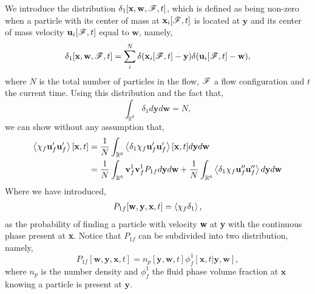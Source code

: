 We introduce the distribution $\delta_1[\textbf{x},\textbf{w},\mathscr{F},t]$, which is defined as being non-zero when a particle with its center of mass at $\textbf{x}_i[\mathscr{F},t]$ is located at $\textbf{y}$ and its center of mass velocity $\textbf{u}_i[\mathscr{F},t]$ equal to $\textbf{w}$, namely, 
\begin{equation*}
    \delta_1[\textbf{x},\textbf{w},\mathscr{F},t] =\sum_i^N \delta(\textbf{x}_i[\mathscr{F},t] - \textbf{y})\delta(\textbf{u}_i[\mathscr{F},t] - \textbf{w}),
\end{equation*}
where $N$ is the total number of particles in the flow, $\mathscr{F}$ a flow configuration and $t$ the current time. 
Using this distribution and the fact that, 
\begin{equation*}
    \int_{\mathbb{R}^6}
    \delta_1
    d \textbf{y}
    d \textbf{w}
    = N,
\end{equation*}
we can show without any assumption that, 
\begin{align}
    \avg{\chi_f \textbf{u}_f' \textbf{u}_f'}[\textbf{x},t]
    &= \frac{1}{N}
    \int_{\mathbb{R}^6}
    \avg{\delta_1\chi_f \textbf{u}_f' \textbf{u}_f'}[\textbf{x},t]
    d\textbf{y}
    d\textbf{w}\\
    &= 
    \frac{1}{N}
    \int_{\mathbb{R}^6}
    \textbf{v}_f^{1}
    \textbf{v}_f^{1}
    P_{1f}
    d\textbf{y}
    d\textbf{w}
    + 
    \frac{1}{N}
    \int_{\mathbb{R}^6}
    \avg{\delta_1 \chi_f\textbf{u}_f'' \textbf{u}_f''}
    d\textbf{y}
    d\textbf{w}
    \label{eq:classic_avg}
\end{align}
Where we have introduced,  
\begin{align}
    P_{1f} [\textbf{w},\textbf{y},\textbf{x},t]
    =
    \left<\chi_f \delta_1\right>,
\end{align}
as the probability of finding a particle with velocity \textbf{w} at \textbf{y} with the continuous phase present at \textbf{x}.
Notice that $P_{1f}$ can be subdivided into two distribution, namely, 
\begin{equation}
    P_{1f} [\textbf{w},\textbf{y},\textbf{x},t]
    = n_p[\textbf{y},\textbf{w},t] \phi_f^1[\textbf{x},t|\textbf{y},\textbf{w}],
\end{equation}
where $n_p$ is the number density and $\phi_f^1$ the fluid phase volume fraction at $\textbf{x}$ knowing a particle is present at $\textbf{y}$. 
